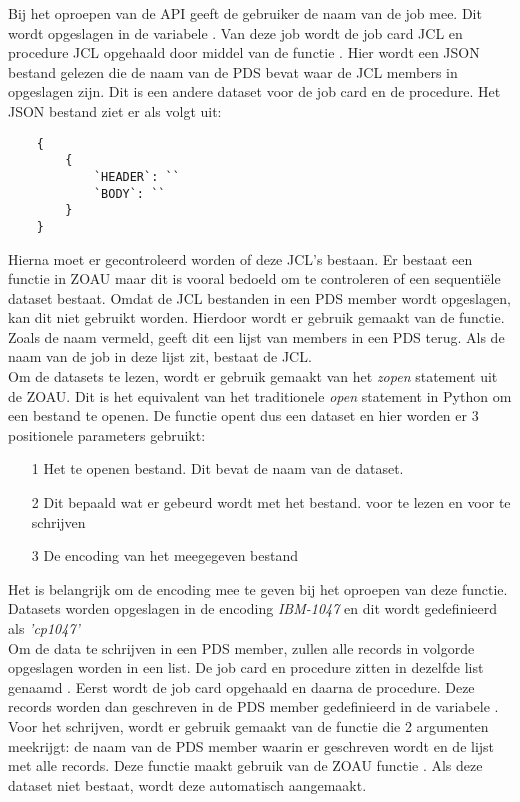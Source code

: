 \vspace{5 mm}
Bij het oproepen van de API geeft de gebruiker de naam van de job mee. Dit wordt opgeslagen in de variabele . Van deze job wordt de job card JCL en procedure JCL opgehaald door middel van de functie . Hier wordt een JSON bestand gelezen die de naam van de PDS bevat waar de JCL members in opgeslagen zijn. Dit is een andere dataset voor de job card en de procedure. Het JSON bestand ziet er als volgt uit: \\

\begin{lstlisting}
    {
        {
            `HEADER`: ``
            `BODY`: ``
        }
    }
\end{lstlisting}

Hierna moet er gecontroleerd worden of deze JCL's bestaan. Er bestaat een  functie in ZOAU maar dit is vooral bedoeld om te controleren of een sequentiële dataset bestaat. Omdat de JCL bestanden in een PDS member wordt opgeslagen, kan dit niet gebruikt worden. Hierdoor wordt er gebruik gemaakt van de  functie. Zoals de naam vermeld, geeft dit een lijst van members in een PDS terug. Als de naam van de job in deze lijst zit, bestaat de JCL. \\
 
Om de datasets te lezen, wordt er gebruik gemaakt van het \textit{zopen} statement uit de ZOAU. Dit is het equivalent van het traditionele \textit{open} statement in Python om een bestand te openen. De  functie opent dus een dataset en hier worden er 3 positionele parameters gebruikt: 
\begin{itemize}
    \item[1] Het te openen bestand. Dit bevat de naam van de dataset.
    \item[2] Dit bepaald wat er gebeurd wordt met het bestand. \textit{} voor te lezen en \textit{} voor te schrijven
    \item[3] De encoding van het meegegeven bestand
\end{itemize} 
Het is belangrijk om de encoding mee te geven bij het oproepen van deze functie. Datasets worden opgeslagen in de encoding \textit{IBM-1047} en dit wordt gedefinieerd als \textit{'cp1047'} \\

Om de data te schrijven in een PDS member, zullen alle records in volgorde opgeslagen worden in een list. De job card en procedure zitten in dezelfde list genaamd . Eerst wordt de job card opgehaald en daarna de procedure. Deze records worden dan geschreven in de PDS member gedefinieerd in de variabele . Voor het schrijven, wordt er gebruik gemaakt van de functie  die 2 argumenten meekrijgt: de naam van de PDS member waarin er geschreven wordt en de lijst met alle records. Deze functie maakt gebruik van de ZOAU functie . Als deze dataset niet bestaat, wordt deze automatisch aangemaakt.


